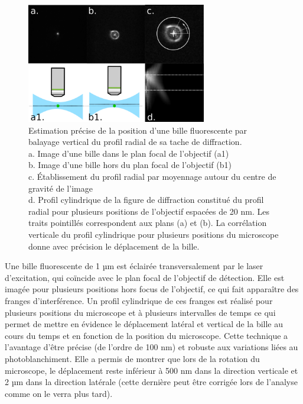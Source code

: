 \begin{figure}
    \centering
    \includegraphics[width=0.7\textwidth]{./files/bead_position.svg.png}
    \caption{Estimation précise de la position d'une bille fluorescente par balayage vertical du profil radial de sa tache de diffraction.
    \\ a. Image d'une bille dans le plan focal de l'objectif (a1)
    \\ b. Image d'une bille hors du plan focal de l'objectif (b1)
    \\ c. Établissement du profil radial par moyennage autour du centre de gravité de l'image
    \\ d. Profil cylindrique de la figure de diffraction constitué du profil radial pour plusieurs positions de l'objectif espacées de 20 nm. Les traits pointillés correspondent aux plans (a) et (b). La corrélation verticale du profil cylindrique pour plusieurs positions du microscope donne avec précision le déplacement de la bille.
    \label{FIGbeadstability}}
    \end{figure}

Une bille fluorescente de 1 µm est éclairée transversalement par le laser d'excitation, qui coïncide avec le plan focal de l'objectif de détection. Elle est imagée pour plusieurs positions hors focus de l'objectif, ce qui fait apparaître des franges d'interférence. Un profil cylindrique de ces franges est réalisé pour plusieurs positions du microscope et à plusieurs intervalles de temps ce qui permet de mettre en évidence le déplacement latéral et vertical de la bille au cours du temps et en fonction de la position du microscope. Cette technique a l'avantage d'être précise (de l'ordre de 100 nm) et robuste aux variations liées au photoblanchiment. Elle a permis de montrer que lors de la rotation du microscope, le déplacement reste inférieur à 500 nm dans la direction verticale et 2 µm dans la direction latérale (cette dernière peut être corrigée lors de l'analyse comme on le verra plus tard).

